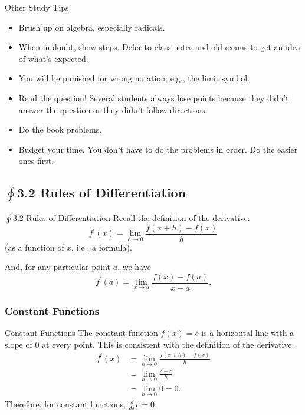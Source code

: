 \documentclass[cal1spr16Lectures.tex]{subfiles}
\begin{document}
\begin{frame}{\small Other Study Tips}\footnotesize
\begin{itemize}
\item Brush up on algebra, especially radicals.
\item When in doubt, show steps.  Defer to class notes and old exams to get an idea of what's expected.
\item You will be punished for wrong notation; e.g., the limit symbol.
\item Read the question!  Several students always lose points because they didn't answer the question or they didn't follow directions.
\item Do the book problems.
\item Budget your time.  You don't have to do the problems in order.  Do the easier ones first.
\end{itemize}
\end{frame}

\subsection[3.2 Rules of Differentiation]{$\textstyle\oint$3.2 Rules of Differentiation}

\begin{frame}{$\oint$3.2 Rules of Differentiation}
Recall the definition of the derivative:
\[f^{\prime}(x)=\lim_{h \to 0} \frac{f(x+h)-f(x)}{h}\]
(as a function of $x$, i.e., a formula).

And, for any particular point $a$, we have 
\[f^{\prime}(a)=\lim_{x \to a} \frac{f(x)-f(a)}{x-a}.\]
\end{frame}

\subsubsection{Constant Functions}

\begin{frame}{\small Constant Functions}\footnotesize
The constant function $f(x)=c$ is a horizontal line with a slope of 0 at every point.  This is consistent with the definition of the derivative:
\begin{align*}
f^{\prime}(x)&=\lim_{h \to 0} \frac{f(x+h)-f(x)}{h} \\
 &=\lim_{h \to 0} \frac{c-c}{h} \\[0.5pc]
 &=\lim_{h \to 0} 0 = 0.
\end{align*}
Therefore, for constant functions, \alert{$\frac{d}{dx}c=0$}.
\end{frame}
\end{document}
